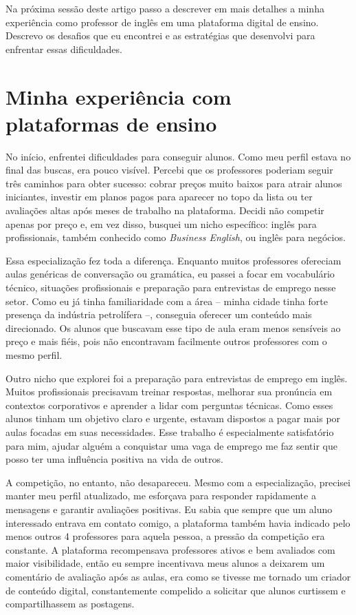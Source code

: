 \documentclass[portuguese]{textolivre}
\begin{document}
Na próxima sessão deste artigo passo a descrever em mais detalhes a minha experiência como professor de inglês em uma plataforma digital de ensino. Descrevo os desafios que eu encontrei e as estratégias que desenvolvi para enfrentar essas dificuldades.

\section{Minha experiência com plataformas de ensino}
No início, enfrentei dificuldades para conseguir alunos. Como meu perfil estava no final das buscas, era pouco visível. Percebi que os professores poderiam seguir três caminhos para obter sucesso: cobrar preços muito baixos para atrair alunos iniciantes, investir em planos pagos para aparecer no topo da lista ou ter avaliações altas após meses de trabalho na plataforma. Decidi não competir apenas por preço e, em vez disso, busquei um nicho específico: inglês para profissionais, também conhecido como \textit{Business English}, ou inglês para negócios.

Essa especialização fez toda a diferença. Enquanto muitos professores ofereciam aulas genéricas de conversação ou gramática, eu passei a focar em vocabulário técnico, situações profissionais e preparação para entrevistas de emprego nesse setor. Como eu já tinha familiaridade com a área -- minha cidade tinha forte presença da indústria petrolífera --, conseguia oferecer um conteúdo mais direcionado. Os alunos que buscavam esse tipo de aula eram menos sensíveis ao preço e mais fiéis, pois não encontravam facilmente outros professores com o mesmo perfil.

Outro nicho que explorei foi a preparação para entrevistas de emprego em inglês. Muitos profissionais precisavam treinar respostas, melhorar sua pronúncia em contextos corporativos e aprender a lidar com perguntas técnicas. Como esses alunos tinham um objetivo claro e urgente, estavam dispostos a pagar mais por aulas focadas em suas necessidades. Esse trabalho é especialmente satisfatório para mim, ajudar alguém a conquistar uma vaga de emprego me faz sentir que posso ter uma influência positiva na vida de outros.

A competição, no entanto, não desapareceu. Mesmo com a especialização, precisei manter meu perfil atualizado, me esforçava para responder rapidamente a mensagens e garantir avaliações positivas. Eu sabia que sempre que um aluno interessado entrava em contato comigo, a plataforma também havia indicado pelo menos outros 4 professores para aquela pessoa, a pressão da competição era constante. A plataforma recompensava professores ativos e bem avaliados com maior visibilidade, então eu sempre incentivava meus alunos a deixarem um comentário de avaliação após as aulas, era como se tivesse me tornado um criador de conteúdo digital, constantemente compelido a solicitar que alunos curtissem e compartilhassem as postagens.
\end{document}
